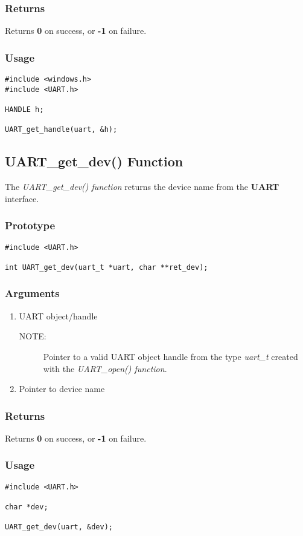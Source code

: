 \documentclass{report}
\begin{document}
\subsubsection*{Returns}
Returns \textbf{0} on success, or \textbf{-1} on failure.
\subsubsection*{Usage}
\begin{lstlisting}
#include <windows.h>
#include <UART.h>

HANDLE h;

UART_get_handle(uart, &h);
\end{lstlisting}
\subsection{UART\_get\_dev() Function}
The \textit{UART\_get\_dev() function} returns the device
name from the \textbf{UART} interface.
\subsubsection*{Prototype}
\begin{lstlisting}
#include <UART.h>

int UART_get_dev(uart_t *uart, char **ret_dev);
\end{lstlisting}
\subsubsection*{Arguments}
\begin{enumerate}
\item UART object/handle
\begin{description}
\item[NOTE:] Pointer to a valid UART object handle from the type \textit{uart\_t}
created with the \textit{UART\_open() function}.
\end{description}
\item Pointer to device name
\end{enumerate}
\subsubsection*{Returns}
Returns \textbf{0} on success, or \textbf{-1} on failure.
\subsubsection*{Usage}
\begin{lstlisting}
#include <UART.h>

char *dev;

UART_get_dev(uart, &dev);
\end{lstlisting}
\end{document}
